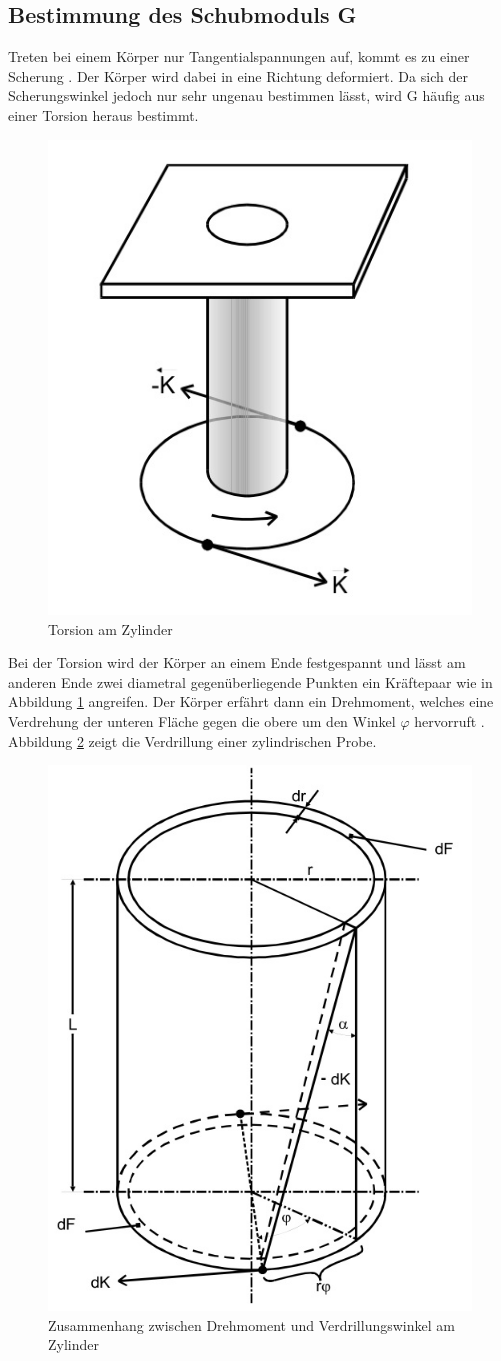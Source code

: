 \subsection{Bestimmung des Schubmoduls G}
Treten bei einem Körper nur Tangentialspannungen auf, kommt es zu einer Scherung
. Der Körper wird dabei in eine Richtung deformiert. Da sich der Scherungswinkel
jedoch nur sehr ungenau bestimmen lässt, wird G häufig aus einer Torsion heraus
bestimmt.
\begin{figure}
  \centering
  \includegraphics[height=0.5\textwidth]{bilder/torsion.jpg}
  \caption{Torsion am Zylinder}
  \label{torsion}
\end{figure}
Bei der Torsion wird der Körper an einem Ende festgespannt und lässt am anderen
Ende zwei diametral gegenüberliegende Punkten ein Kräftepaar wie in Abbildung
\ref{torsion} angreifen. Der Körper erfährt dann ein Drehmoment, welches eine
Verdrehung der unteren Fläche gegen die obere um den Winkel $\varphi$ hervorruft
. Abbildung \ref{drill} zeigt die Verdrillung einer zylindrischen Probe.
\begin{figure}[H]
  \centering
  \includegraphics[height=0.5\textwidth]{bilder/verdrillung.jpg}
  \caption{Zusammenhang zwischen Drehmoment und Verdrillungswinkel am Zylinder
  \cite{102}}
  \label{drill}
\end{figure}
